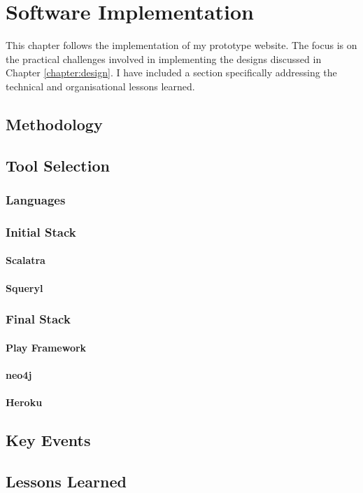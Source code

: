 \chapter{Software Implementation}
\label{chapter:implementation}
  This chapter follows the implementation of my prototype website. The focus is on the practical challenges involved in implementing the designs discussed in Chapter \ref{chapter:design}. I have included a section specifically addressing the technical and organisational lessons learned.

  \section{Methodology}
  \section{Tool Selection}
    \subsection{Languages}
    \subsection{Initial Stack}
      \subsubsection{Scalatra}
      \subsubsection{Squeryl}
    \subsection{Final Stack}
      \subsubsection{Play Framework}
      \subsubsection{neo4j}
      \subsubsection{Heroku}
  \section{Key Events}
  \section{Lessons Learned}

